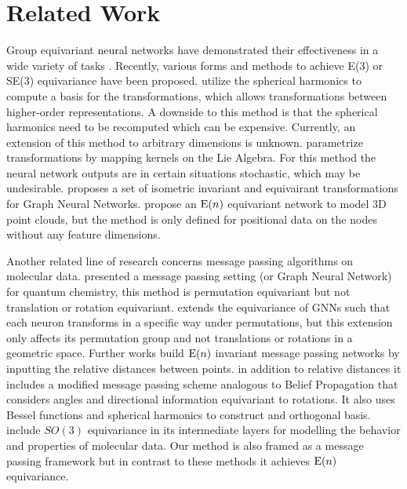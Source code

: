 


\section{Related Work} \label{sec:related_work}
Group equivariant neural networks have demonstrated their effectiveness in a wide variety of tasks \citep{cohen2016group,cohen2017steerable,weiler2019e2equivariant,rezende2019equivariantflows,romero2021group}.
Recently, various forms and methods to achieve E(3) or SE(3) equivariance have been proposed. \citet{thomas2018tensor, fuchs2020se} utilize the spherical harmonics to compute a basis for the transformations, which allows transformations between higher-order representations. A downside to this method is that the spherical harmonics need to be recomputed which can be expensive. Currently, an extension of this method to arbitrary dimensions is unknown. \citet{finzi2020generalizing} parametrize transformations by mapping kernels on the Lie Algebra. For this method the neural network outputs are in certain situations stochastic, which may be undesirable. \citet{horie2020isometric} proposes a set of isometric invariant and equivairant transformations for Graph Neural Networks.
\citet{kohler2019equivariant_workshop, kohler2020equivariant_icml} propose an $\mathrm{E}(n)$ equivariant network to model 3D point clouds, but the method is only defined for positional data on the nodes without any feature dimensions.

Another related line of research concerns message passing algorithms on molecular data. \cite{gilmer2017neural} presented a message passing setting (or Graph Neural Network) for quantum chemistry, this method is permutation equivariant but not translation or rotation equivariant. \cite{kondor2018covariant} extends the equivariance of GNNs such that each neuron transforms in a specific way under permutations, but this extension only affects its permutation group and not translations or rotations in a geometric space. Further works \cite{schutt2017schnet, schutt2017quantum} build $\mathrm{E}(n)$ invariant message passing networks by inputting the relative distances between points. \citet{klicpera2020directional, klicpera2020fast} in addition to relative distances it includes a modified message passing scheme analogous to Belief Propagation that considers angles and directional information equivariant to rotations. It also uses Bessel functions and spherical harmonics to construct and orthogonal basis. \citet{anderson2019cormorant, miller2020relevance} include $SO(3)$ equivariance in its intermediate layers for modelling the behavior and properties of molecular data. Our method is also framed as a message passing framework but in contrast to these methods it achieves $\mathrm{E}(n)$ equivariance.


